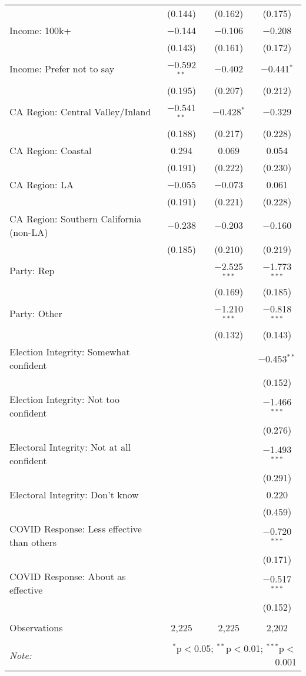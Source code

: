\begin{table}[!htbp]
\begin{tabular}{@{\extracolsep{5pt}}lccc}
  & (0.144) & (0.162) & (0.175) \\ 
  Income: 100k+ & $-$0.144 & $-$0.106 & $-$0.208 \\ 
  & (0.143) & (0.161) & (0.172) \\ 
  Income: Prefer not to say & $-$0.592$^{**}$ & $-$0.402 & $-$0.441$^{*}$ \\ 
  & (0.195) & (0.207) & (0.212) \\ 
  CA Region: Central Valley/Inland & $-$0.541$^{**}$ & $-$0.428$^{*}$ & $-$0.329 \\ 
  & (0.188) & (0.217) & (0.228) \\ 
  CA Region: Coastal & 0.294 & 0.069 & 0.054 \\ 
  & (0.191) & (0.222) & (0.230) \\ 
  CA Region: LA & $-$0.055 & $-$0.073 & 0.061 \\ 
  & (0.191) & (0.221) & (0.228) \\ 
  CA Region: Southern California (non-LA) & $-$0.238 & $-$0.203 & $-$0.160 \\ 
  & (0.185) & (0.210) & (0.219) \\ 
  Party: Rep &  & $-$2.525$^{***}$ & $-$1.773$^{***}$ \\ 
  &  & (0.169) & (0.185) \\ 
  Party: Other &  & $-$1.210$^{***}$ & $-$0.818$^{***}$ \\ 
  &  & (0.132) & (0.143) \\ 
  Election Integrity: Somewhat confident &  &  & $-$0.453$^{**}$ \\ 
  &  &  & (0.152) \\ 
  Election Integrity: Not too confident &  &  & $-$1.466$^{***}$ \\ 
  &  &  & (0.276) \\ 
  Electoral Integrity: Not at all confident &  &  & $-$1.493$^{***}$ \\ 
  &  &  & (0.291) \\ 
  Electoral Integrity: Don't know &  &  & 0.220 \\ 
  &  &  & (0.459) \\ 
  COVID Response: Less effective than others &  &  & $-$0.720$^{***}$ \\ 
  &  &  & (0.171) \\ 
  COVID Response: About as effective &  &  & $-$0.517$^{***}$ \\ 
  &  &  & (0.152) \\ 
 \hline \\[-1.8ex] 
Observations & 2,225 & 2,225 & 2,202 \\ 
\hline 
\hline \\[-1.8ex] 
\textit{Note:}  & \multicolumn{3}{r}{$^{*}$p$<$0.05; $^{**}$p$<$0.01; $^{***}$p$<$0.001} \\ 
\end{tabular} 
\end{table} 

